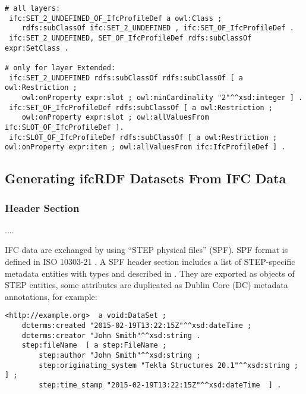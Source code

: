 
\begin{lstlisting}
# all layers:
 ifc:SET_2_UNDEFINED_OF_IfcProfileDef a owl:Class ;
    rdfs:subClassOf ifc:SET_2_UNDEFINED , ifc:SET_OF_IfcProfileDef .
 ifc:SET_2_UNDEFINED, SET_OF_IfcProfileDef rdfs:subClassOf expr:SetClass .

# only for layer Extended:
 ifc:SET_2_UNDEFINED rdfs:subClassOf rdfs:subClassOf [ a owl:Restriction ;
    owl:onProperty expr:slot ; owl:minCardinality "2"^^xsd:integer ] .
 ifc:SET_OF_IfcProfileDef rdfs:subClassOf [ a owl:Restriction ;
    owl:onProperty expr:slot ; owl:allValuesFrom ifc:SLOT_OF_IfcProfileDef ].
 ifc:SLOT_OF_IfcProfileDef rdfs:subClassOf [ a owl:Restriction ; owl:onProperty expr:item ; owl:allValuesFrom ifc:IfcProfileDef ] .
\end{lstlisting}



\subsection{Generating ifcRDF Datasets From IFC Data}
\label{sec:ifcRDF}

\subsubsection{Header Section} ....

IFC data are exchanged by using ``STEP physical files'' (SPF). SPF format is defined in ISO 10303-21 \cite{wiki:step-file}. A SPF header section includes a list of STEP-specific metadata entities with types   and  described in \cite{buildingSMART:ifc-header}. They are exported as objects of STEP entities, some attributes are duplicated as Dublin Core (DC) metadata annotations, for example:

\begin{lstlisting}
<http://example.org>  a void:DataSet ;
    dcterms:created "2015-02-19T13:22:15Z"^^xsd:dateTime ;
    dcterms:creator "John Smith"^^xsd:string .
    step:fileName  [ a step:FileName ;
        step:author "John Smith"^^xsd:string ;
        step:originating_system "Tekla Structures 20.1"^^xsd:string ; ] ;
        step:time_stamp "2015-02-19T13:22:15Z"^^xsd:dateTime  ] .
\end{lstlisting}


